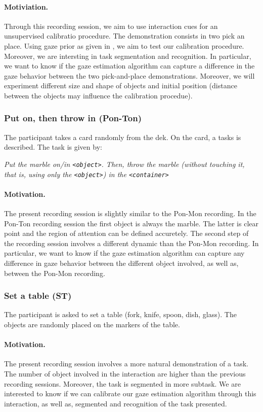 \documentclass[11pt,a4paper]{article}
\begin{document}
\paragraph{Motiviation.} Through this recording session, we aim to use interaction cues for an unsupervised calibratio procedure. The demonstration consists in two pick an place. Using gaze prior as given in \cite{Land2009}, we aim to test our calibration procedure. Moreover, we are intersting in task segmentation and recognition. In particular, we want to know if the gaze estimation algorithm can capture a difference in the gaze behavior between the two pick-and-place demonstrations. Moreover, we will experiment different size and shape of objects and initial position (distance between the objects may influence the calibration procedue).

\subsubsection{Put on, then throw in (Pon-Ton)}
The participant takes a card randomly from the dek. On the card, a tasks is described. The task is given by:
\begin{center}
\textit{Put the marble on/in \texttt{<object>}. Then, throw the marble (without touching it, that is, using only the \texttt{<object>}) in the \texttt{<container>}}
\end{center}
\paragraph{Motivation.} The present recording session is slightly similar to the Pon-Mon recording. In the Pon-Ton recording session the first object is always the marble. The latter is clear point and the region of attention can be defined accuretely. The second step of the recording session involves a different dynamic than the Pon-Mon recording. In particular, we want to know if the gaze estimation algorithm can capture any difference in gaze behavior between the different object involved, as well as, between the Pon-Mon recording.

\subsubsection{Set a table (ST)}
The participant is asked to set a table (fork, knife, spoon, dish, glass). The objects are randomly placed on the markers of the table.
\paragraph{Motivation.}
The present recording session involves a more natural demonstration of a task. The number of object involved in the interaction are higher than the previous recording sessions. Moreover, the task is segmented in more subtask. We are interested to know if we can calibrate our gaze estimation algorithm through this interaction, as well as, segmented and recognition of the task presented.
\end{document}
